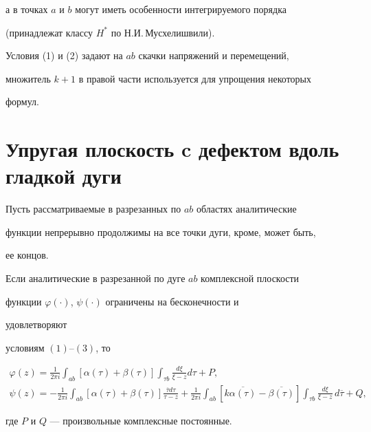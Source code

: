 а в точках $a$ и $b$ могут иметь особенности интегрируемого порядка


(принадлежат классу $H^*$ по Н.И.\,Мусхелишвили).





Условия (1) и (2) задают на $ab$ скачки напряжений и перемещений,


множитель $k+1$ в правой части используется для упрощения некоторых


формул.





\section{Упругая плоскость c дефектом вдоль гладкой дуги}





Пусть рассматриваемые в разрезанных по $ab$ областях аналитические


функции непрерывно продолжимы на все точки дуги, кроме, может быть,


ее концов.





\begin{lem}


Если аналитические в разрезанной по дуге $ab$ комплексной плоскости


функции $\varphi(\cdot)$, $\psi(\cdot)$ ограничены на бесконечности и


удовлетворяют


условиям $(1)$--$(3)$, то


\begin{gather}


\varphi(z) = \frac{1}{2\pi i}\int_{ab} [\alpha(\tau)+\beta(\tau)]


\int_{\tau b}\frac{d\xi}{\xi-z}d\tau + P, \\


%


\psi(z) = - \frac{1}{2\pi i}\int_{ab} [\alpha(\tau)+\beta(\tau)]


\frac{\overline{\tau}d\tau}{\tau-z} +


\frac{1}{2\pi i}\int_{ab} [k\overline{\alpha(\tau)}


-\overline{\beta(\tau)}]


\int_{\tau b}\frac{d\xi}{\xi-z}\,d\overline{\tau} + Q,


\end{gather}


где $P$ и $Q$ --- произвольные комплексные постоянные.


\end{lem}





